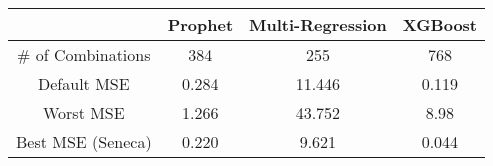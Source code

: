 \begin{tabular}{|c|c|c|c|}
\hline
& Prophet & Multi-Regression & XGBoost\\
\hline
\# of Combinations & 384 & 255 & 768\\
\hline
\hline
Default MSE & 0.284 & 11.446 & 0.119 \\
\hline
Worst MSE & 1.266 & 43.752 & 8.98 \\
\hline
Best MSE (Seneca) & 0.220 & 9.621 & 0.044 \\
\hline
\end{tabular}
